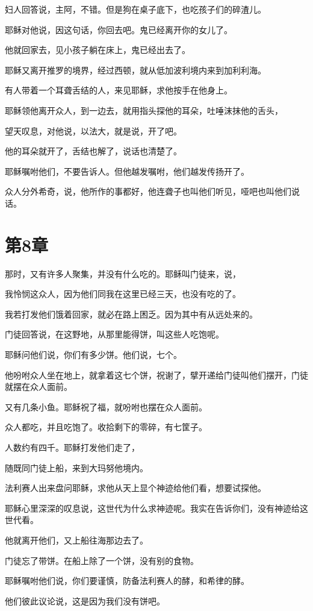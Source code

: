 \documentclass[12pt,oneside]{book}
\begin{document}
妇人回答说，主阿，不错。但是狗在桌子底下，也吃孩子们的碎渣儿。

耶稣对他说，因这句话，你回去吧。鬼已经离开你的女儿了。

他就回家去，见小孩子躺在床上，鬼已经出去了。

耶稣又离开推罗的境界，经过西顿，就从低加波利境内来到加利利海。

有人带着一个耳聋舌结的人，来见耶稣，求他按手在他身上。

耶稣领他离开众人，到一边去，就用指头探他的耳朵，吐唾沫抹他的舌头，

望天叹息，对他说，以法大，就是说，开了吧。

他的耳朵就开了，舌结也解了，说话也清楚了。

耶稣嘱咐他们，不要告诉人。但他越发嘱咐，他们越发传扬开了。

众人分外希奇，说，他所作的事都好，他连聋子也叫他们听见，哑吧也叫他们说话。

\chapter{第8章}
那时，又有许多人聚集，并没有什么吃的。耶稣叫门徒来，说，

我怜悯这众人，因为他们同我在这里已经三天，也没有吃的了。

我若打发他们饿着回家，就必在路上困乏。因为其中有从远处来的。

门徒回答说，在这野地，从那里能得饼，叫这些人吃饱呢。

耶稣问他们说，你们有多少饼。他们说，七个。

他吩咐众人坐在地上，就拿着这七个饼，祝谢了，擘开递给门徒叫他们摆开，门徒就摆在众人面前。

又有几条小鱼。耶稣祝了福，就吩咐也摆在众人面前。

众人都吃，并且吃饱了。收拾剩下的零碎，有七筐子。

人数约有四千。耶稣打发他们走了，

随既同门徒上船，来到大玛努他境内。

法利赛人出来盘问耶稣，求他从天上显个神迹给他们看，想要试探他。

耶稣心里深深的叹息说，这世代为什么求神迹呢。我实在告诉你们，没有神迹给这世代看。

他就离开他们，又上船往海那边去了。

门徒忘了带饼。在船上除了一个饼，没有别的食物。

耶稣嘱咐他们说，你们要谨慎，防备法利赛人的酵，和希律的酵。

他们彼此议论说，这是因为我们没有饼吧。
\end{document}
